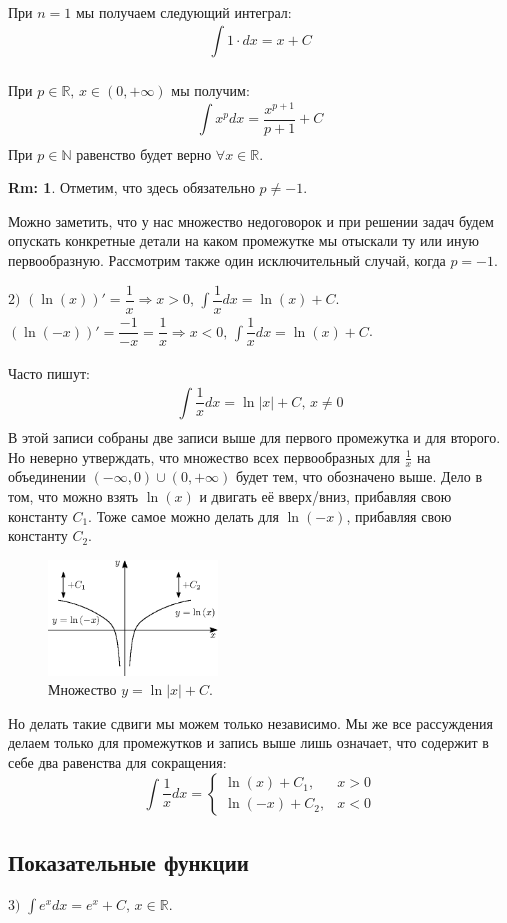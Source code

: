 \documentclass[12pt]{article}
\newcommand{\MR}{\mathbb{R}}
\newcommand{\MN}{\mathbb{N}}
\theoremstyle{definition}
\newtheorem{rem}{Rm:}
\newcommand{\ddint}[2]{\displaystyle\int\limits_{#1}^{#2}}
\begin{document}
При $n = 1$ мы получаем следующий интеграл: 
$$
	\ddint{}{}1{\cdot}dx = x + C
$$

При $p \in \MR, \, x \in (0,+\infty)$ мы получим: 
$$
	\ddint{}{}x^pdx = \dfrac{x^{p+1}}{p+1} + C
$$ 
При $p \in \MN$ равенство будет верно $\forall x \in \MR$.
\begin{rem}
	Отметим, что здесь обязательно $p \neq -1$.
\end{rem}

Можно заметить, что у нас множество недоговорок и при решении задач будем опускать конкретные детали на каком промежутке мы отыскали ту или иную первообразную. Рассмотрим также один исключительный случай, когда $p = -1$. 

$2)$ $(\ln{(x)})' = \dfrac{1}{x} \Rightarrow x > 0, \, \ddint{}{}\dfrac{1}{x}dx = \ln{(x)} + C$. $(\ln{(-x)})' = \dfrac{-1}{-x} = \dfrac{1}{x} \Rightarrow x<0, \, \ddint{}{}\dfrac{1}{x}dx = \ln{(x)} + C$.

Часто пишут: 
$$
	\ddint{}{}\dfrac{1}{x}dx = \ln{|x|} + C, \, x \neq 0
$$ 
В этой записи собраны две записи выше для первого промежутка и для второго. Но неверно утверждать, что множество всех первообразных для $\frac{1}{x}$ на объединении $(-\infty, 0) \cup (0,+\infty)$ будет тем, что обозначено выше. Дело в том, что можно взять $\ln{(x)}$ и двигать её вверх/вниз, прибавляя свою константу $C_1$. Тоже самое можно делать для $\ln{(-x)}$, прибавляя свою константу $C_2$.

\begin{figure}[H]
	\centering
	\includegraphics[width=0.4\textwidth]{MA2S1_1.eps}
	\caption{Множество $y = \ln{|x|} + C$.}
	\label{1_1}
\end{figure}
Но делать такие сдвиги мы можем только независимо. Мы же все рассуждения делаем только для промежутков и запись выше лишь означает, что содержит в себе два равенства для сокращения:
$$
	\ddint{}{}\dfrac{1}{x}dx = 
	\begin{cases}
		\ln{(x)} + C_1, & x > 0 \\
		\ln{(-x)} + C_2, & x < 0
	\end{cases}
$$

\subsection*{Показательные функции}
$3)$ $\ddint{}{}e^x dx = e^x + C, \, x \in \MR$.
\end{document}
